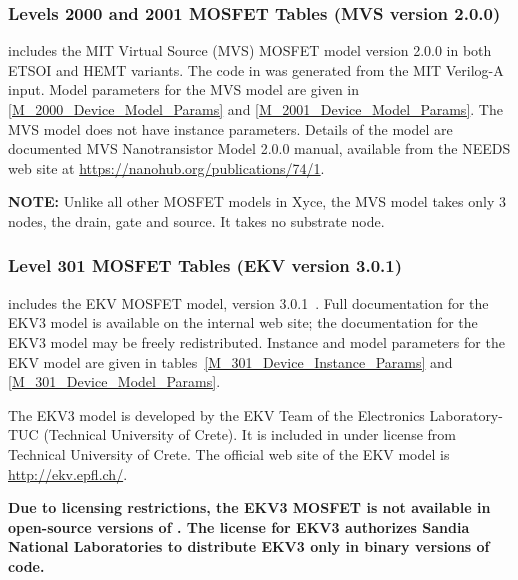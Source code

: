 








\clearpage
\subsubsection{Levels 2000 and 2001 MOSFET Tables (MVS version 2.0.0)}
\Xyce{} includes the MIT Virtual Source (MVS) MOSFET model version
2.0.0 in both ETSOI and HEMT variants.  The code in \Xyce{} was
generated from the MIT Verilog-A input.  Model parameters for the MVS
model are given in \ref{M_2000_Device_Model_Params} and
\ref{M_2001_Device_Model_Params}.  The MVS model does not have
instance parameters.  Details of the model are documented MVS
Nanotransistor Model 2.0.0 manual, available from the NEEDS web site
at \url{https://nanohub.org/publications/74/1}.

{\bf NOTE: } Unlike all other MOSFET models in Xyce, the MVS model
takes only 3 nodes, the drain, gate and source.  It takes no substrate
node.




\clearpage
\subsubsection{Level 301 MOSFET Tables (EKV version 3.0.1)}
\Xyce{} includes the EKV MOSFET model, version
3.0.1~\cite{BLETK:1997}\cite{EKV:2006}\cite{EKV:2007}.  Full
documentation for the EKV3 model is available on the \Xyce{} internal web site;
the documentation for the EKV3 model may be freely redistributed.  Instance and
model parameters for the EKV model are given in
tables~\ref{M_301_Device_Instance_Params} and \ref{M_301_Device_Model_Params}.

The EKV3 model is developed by the EKV Team of the Electronics Laboratory-TUC
(Technical University of Crete). It is included in \Xyce{} under license from
Technical University of Crete.  The official web site of the EKV model is
\url{http://ekv.epfl.ch/}.

\textbf{Due to licensing restrictions, the EKV3 MOSFET is not available in
     open-source versions of \Xyce{}.  The license for EKV3 authorizes Sandia
     National Laboratories to distribute EKV3 only in binary versions of code.}





